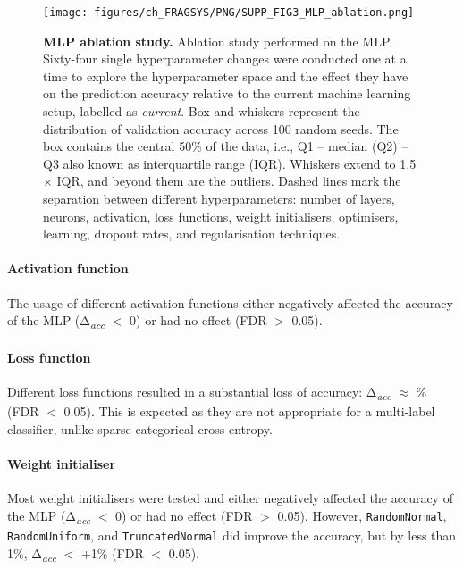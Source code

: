 {\begin{figure}[ht!]
    \centering
    \texttt{[image: figures/ch\_FRAGSYS/PNG/SUPP\_FIG3\_MLP\_ablation.png]}
    \caption[MLP ablation study]{\textbf{MLP ablation study.} Ablation study performed on the MLP. Sixty-four single hyperparameter changes were conducted one at a time to explore the hyperparameter space and the effect they have on the prediction accuracy relative to the current machine learning setup, labelled as \textit{current}. Box and whiskers represent the distribution of validation accuracy across 100 random seeds. The box contains the central 50\% of the data, i.e., Q1 – median (Q2) – Q3  also known as interquartile range (IQR). Whiskers extend to 1.5 $\times$ IQR, and beyond them are the outliers. Dashed lines mark the separation between different hyperparameters: number of layers, neurons, activation, loss functions, weight initialisers, optimisers, learning, dropout rates, and regularisation techniques.}
    \label{fig:mlp_ablation}
\end{figure}

\paragraph{Activation function}

The usage of different activation functions either negatively affected the accuracy of the MLP (Δ\textsubscript{\textit{acc}} $<$ 0) or had no effect (FDR $>$ 0.05).

\paragraph{Loss function}

Different loss functions resulted in a substantial loss of accuracy: Δ\textsubscript{\textit{acc}} $\approx$ \% (FDR $<$ 0.05). This is expected as they are not appropriate for a multi-label classifier, unlike sparse categorical cross-entropy.

\paragraph{Weight initialiser}

Most weight initialisers were tested and either negatively affected the accuracy of the MLP (Δ\textsubscript{\textit{acc}} $<$ 0) or had no effect (FDR $>$ 0.05). However, \texttt{RandomNormal}, \texttt{RandomUniform}, and \texttt{TruncatedNormal} did improve the accuracy, but by less than 1\%, Δ\textsubscript{\textit{acc}} $<$ +1\% (FDR $<$ 0.05).

}
